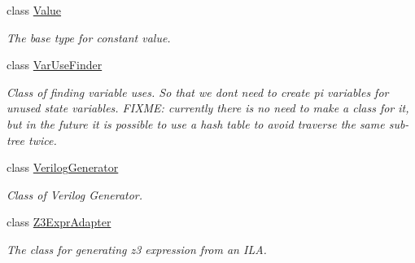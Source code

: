 \begin{DoxyCompactItemize}
class \mbox{\hyperlink{classilang_1_1_value}{Value}}
\begin{DoxyCompactList}\small\item\em The base type for constant value. \end{DoxyCompactList}\item 
class \mbox{\hyperlink{classilang_1_1_var_use_finder}{Var\+Use\+Finder}}
\begin{DoxyCompactList}\small\item\em Class of finding variable uses. So that we don\textquotesingle{}t need to create pi variables for unused state variables. F\+I\+X\+ME\+: currently there is no need to make a class for it, but in the future it is possible to use a hash table to avoid traverse the same sub-\/tree twice. \end{DoxyCompactList}\item 
class \mbox{\hyperlink{classilang_1_1_verilog_generator}{Verilog\+Generator}}
\begin{DoxyCompactList}\small\item\em Class of Verilog Generator. \end{DoxyCompactList}\item 
class \mbox{\hyperlink{classilang_1_1_z3_expr_adapter}{Z3\+Expr\+Adapter}}
\begin{DoxyCompactList}\small\item\em The class for generating z3 expression from an I\+LA. \end{DoxyCompactList}\end{DoxyCompactItemize}
